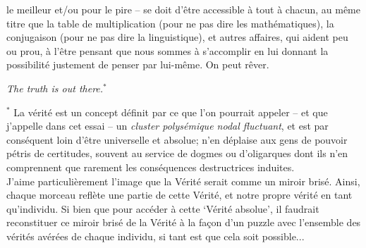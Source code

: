 \documentclass{article}
\begin{document}
le meilleur et/ou pour le pire -- se doit d'être accessible à tout à chacun, au même titre que la table de multiplication (pour ne pas dire les mathématiques), la conjugaison (pour ne pas dire la linguistique), et autres affaires, qui aident peu ou prou, à l'être pensant que nous sommes à s'accomplir en lui donnant la possibilité justement de penser par lui-même. On peut rêver.

%
%
\newpage
  
\nolinenumbers
{}
\printendnotes

\newpage

\begin{titlepage} 
\clearpage
\thispagestyle{empty}
\pagecolor{yellow!10}

\vspace*{\baselineskip} 	
	
	\vspace*{0.2867\textheight} 
	
\centerline{\textsl{The truth is out there.}$^*$}
  \vfill
  {\scriptsize \noindent $^*$ La vérité est un concept définit par ce que l'on pourrait appeler -- et que j'appelle dans cet essai -- un \textit{cluster polysémique nodal fluctuant}, et est par conséquent loin d'être universelle et absolue; n'en déplaise aux gens de pouvoir pétris de certitudes, souvent au service de dogmes ou d'oligarques dont ils n'en comprennent que rarement les conséquences destructrices induites.\\ \indent J'aime particulièrement l'image que la Vérité serait comme un miroir brisé. Ainsi, chaque morceau reflète une partie de cette Vérité, et notre propre vérité en tant qu'individu. Si bien que pour accéder à cette `Vérité absolue', il faudrait reconstituer ce miroir brisé de la Vérité à la façon d'un puzzle avec l'ensemble des vérités avérées de chaque individu, si tant est que cela soit possible...
  }
  

\end{titlepage}
\end{document}
